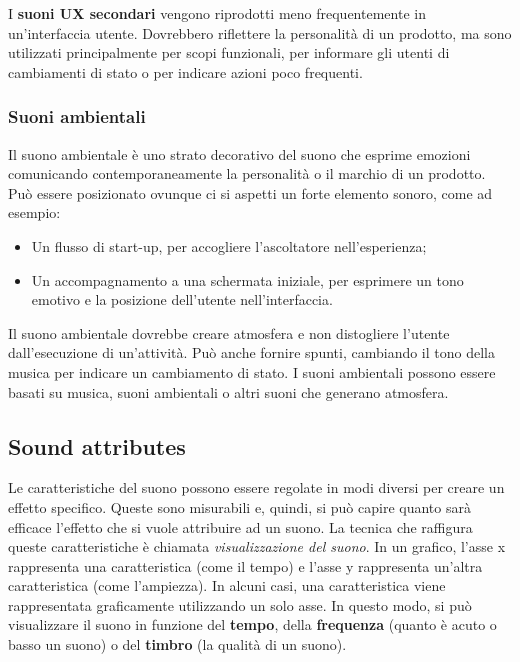 \documentclass[12pt, a4paper]{report}
\begin{document}
                I \textbf{suoni UX secondari} vengono riprodotti meno frequentemente in un'interfaccia utente. Dovrebbero riflettere la personalità di un prodotto, ma sono utilizzati principalmente per scopi
                funzionali, per informare gli utenti di cambiamenti di stato o per indicare azioni poco frequenti.


                 \subsubsection{Suoni ambientali}
                   Il suono ambientale è uno strato decorativo del suono che esprime emozioni comunicando contemporaneamente la personalità o il marchio di un prodotto. Può essere
                   posizionato ovunque ci si aspetti un forte elemento sonoro, come ad esempio:
                   \begin{itemize}
                       \item Un flusso di start-up, per accogliere l'ascoltatore nell'esperienza;
                       \item Un accompagnamento a una schermata iniziale, per esprimere un tono emotivo e la posizione dell'utente nell'interfaccia.
                   \end{itemize}
                   Il suono ambientale dovrebbe creare atmosfera e non distogliere l'utente dall'esecuzione di un'attività. Può anche fornire spunti, cambiando il tono della musica per indicare un cambiamento di stato.
                   I suoni ambientali possono essere basati su musica,  suoni ambientali o altri suoni che generano atmosfera.


              \subsection{Sound attributes}
                 Le caratteristiche del suono possono essere regolate in modi diversi per creare un effetto specifico. Queste sono misurabili e, quindi, si può capire quanto sarà efficace l'effetto che si vuole attribuire ad un suono. La tecnica che raffigura
                 queste caratteristiche è chiamata \textit{visualizzazione del suono}. In un grafico, l'asse x rappresenta una caratteristica (come il tempo) e l'asse y rappresenta un'altra caratteristica  (come l'ampiezza). In alcuni casi, una caratteristica
                 viene rappresentata graficamente utilizzando un solo asse. In questo modo, si può visualizzare il suono in funzione del \textbf{tempo}, della \textbf{frequenza} (quanto è acuto o basso un suono) o del \textbf{timbro} (la qualità di un suono).
\end{document}
